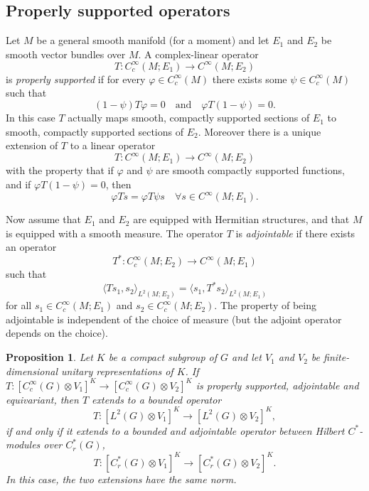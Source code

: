 \documentclass[leqno,11pt]{amsart}
\numberwithin{equation}{subsection}
\theoremstyle{plain}
\newtheorem{proposition}[equation]{Proposition}
\theoremstyle{definition}
\theoremstyle{remark}
\begin{document}
\subsection{Properly supported operators}
\label{subsec-properly-supported}
Let $M$ be   a general smooth manifold (for a moment) and let  $E_1$ and $E_2$ be  smooth   vector bundles over $M$.    A complex-linear operator
\[
T \colon C_c^\infty (M;E_1) \longrightarrow C^\infty (M;E_2)
\]
is \emph{properly supported} if for every   $\varphi\in C_c^\infty (M)$ there exists some $\psi \in C_c^\infty(M)$ such that 
\[
(1-\psi) T \varphi = 0 \quad\text{and} \quad \varphi T (1 - \psi) = 0.
\]
In this case $T$ actually maps smooth, compactly supported sections of $E_1$ to smooth, compactly supported sections of $E_2$.  Moreover there is a unique extension of $T$  to a linear operator 
\[
T \colon C^\infty (M;E_1) \longrightarrow C^\infty (M;E_2)
\]
with the property that if $\varphi$ and $\psi$ are smooth compactly supported functions, and if $\varphi T (1 {-} \psi) = 0$, then 
\[
\varphi T s = \varphi T \psi s \quad \forall s \in C^\infty (M;E_1).
\]

Now assume that $E_1$ and $E_2$ are equipped with Hermitian structures, and that $M$ is equipped with a smooth measure. The operator $T$ is  \emph{adjointable} if there exists  an operator 
\[
T^* \colon C_c^\infty (M;E_2) \longrightarrow C^\infty (M;E_1)
\]
such that 
\[
\langle Ts_1,s_2\rangle _{L^2(M;E_2)} = \langle s_1,T^*s_2\rangle _{L^2(M;E_1)} 
\]
for all $s_1\in C_c^\infty (M;E_1)$ and $s_2\in C_c^\infty (M;E_2)$.  The property of being  adjointable is independent of the choice of measure (but the adjoint operator depends on the choice).



\begin{proposition} 
Let $K$ be a compact subgroup of $G$ and let $V_1$ and $V_2 $ be  finite-dimensional unitary representations of $K$.   
If $T\colon  [C_c^\infty (G)\otimes V_1]^K \to [C_c^\infty (G)\otimes V_2]^K $ is properly supported, adjointable and equivariant, then $T$ extends to a bounded operator 
\[
T\colon  [L^2 (G)\otimes V_1]^K \to [L^2 (G)\otimes V_2]^K,
\]
if and only if it  extends to a bounded and adjointable operator between Hilbert $C^*$-modules over $C^*_r (G)$,
\[
T\colon  [C^*_r (G)\otimes V_1]^K \to [C^*_r (G)\otimes V_2]^K.
\]
In this case, the two extensions have the same norm.
\end{proposition} 
\end{document}
